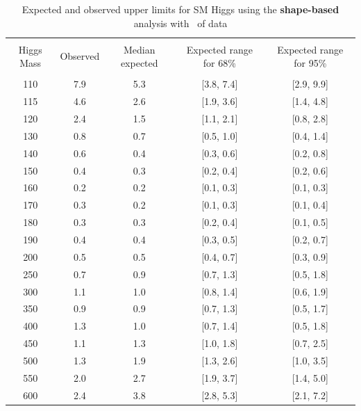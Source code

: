 
\begin{table}[hbp!]
\begin{center}
\begin{tabular}{c c c c c}
\hline
\vspace{-3mm} && \\
 Higgs Mass   & Observed & Median expected & Expected range for 68\% & Expected range for 95\%   \\
\vspace{-3mm} && \\
\hline
110 & 7.9 & 5.3 & [3.8, 7.4] & [2.9, 9.9] \\
115 & 4.6 & 2.6 & [1.9, 3.6] & [1.4, 4.8] \\
120 & 2.4 & 1.5 & [1.1, 2.1] & [0.8, 2.8] \\
130 & 0.8 & 0.7 & [0.5, 1.0] & [0.4, 1.4] \\
140 & 0.6 & 0.4 & [0.3, 0.6] & [0.2, 0.8] \\
150 & 0.4 & 0.3 & [0.2, 0.4] & [0.2, 0.6] \\
160 & 0.2 & 0.2 & [0.1, 0.3] & [0.1, 0.3] \\
170 & 0.3 & 0.2 & [0.1, 0.3] & [0.1, 0.4] \\
180 & 0.3 & 0.3 & [0.2, 0.4] & [0.1, 0.5] \\
190 & 0.4 & 0.4 & [0.3, 0.5] & [0.2, 0.7] \\
200 & 0.5 & 0.5 & [0.4, 0.7] & [0.3, 0.9] \\
250 & 0.7 & 0.9 & [0.7, 1.3] & [0.5, 1.8] \\
300 & 1.1 & 1.0 & [0.8, 1.4] & [0.6, 1.9] \\
350 & 0.9 & 0.9 & [0.7, 1.3] & [0.5, 1.7] \\
400 & 1.3 & 1.0 & [0.7, 1.4] & [0.5, 1.8] \\
450 & 1.1 & 1.3 & [1.0, 1.8] & [0.7, 2.5] \\
500 & 1.3 & 1.9 & [1.3, 2.6] & [1.0, 3.5] \\
550 & 2.0 & 2.7 & [1.9, 3.7] & [1.4, 5.0] \\
600 & 2.4 & 3.8 & [2.8, 5.3] & [2.1, 7.2] \\
\hline
\end{tabular}
\caption{Expected and observed upper limits for SM Higgs using the
  {\bf shape-based} analysis with \intlumi\ of data}
\label{tab:mvabase_uls}
\end{center}
\end{table}

